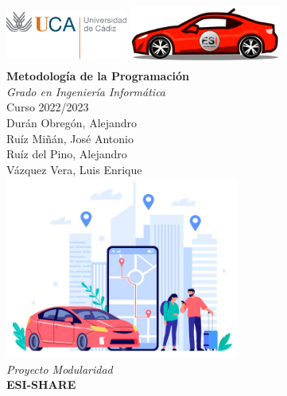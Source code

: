 
\begin{titlepage}
  
  \begin{minipage}{14cm}
    \center

    \includegraphics[width=4cm,height=2cm]{FOTOS/uca}
    \hspace{2cm}
    \includegraphics[width=5cm,height=2cm]{FOTOS/logo_ESI-SHARE.png}\\[1cm]
  
    {\Huge\bfseries Metodología de la Programación}\\[1\baselineskip]
    {\huge\textit{Grado en Ingeniería Informática}}\\[1\baselineskip]
    {\large Curso 2022/2023}\\[2\baselineskip]
    
    {\large {Durán Obregón, Alejandro}}\\[0.3cm]
    {\large {Ruíz Miñán, José Antonio}}\\[0.3cm]
    {\large {Ruíz del Pino, Alejandro}}\\[0.3cm]
    {\large {Vázquez Vera, Luis Enrique}}\\[0.3cm]

    \includegraphics[width=7.7cm,height=6cm]{FOTOS/logo}\\[1cm]
    
    {\Large\textit{Proyecto Modularidad}}\\[1\baselineskip]
    {\Large\textbf{ESI-SHARE}}\\
    
  \end{minipage}
 
\end{titlepage}